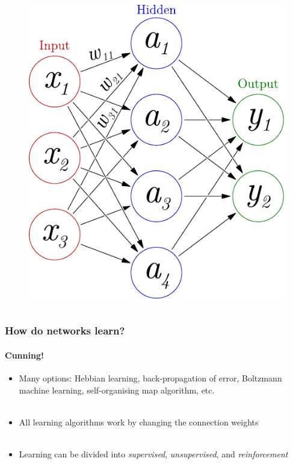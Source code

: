 \documentclass{beamer}
\newcommand{\figheight}{0.72\textheight}
\begin{document}
\begin{frame}
\begin{columns}[T]
\begin{column}{.55\textwidth}
\begin{figure}[t]
\begin{flushleft}
	\includegraphics[height = \figheight]{./fig/3-layer_maths.pdf}
	\vspace{1cm}
	\end{flushleft}
	\end{figure}
    \end{column}
  \end{columns}
\end{frame}

\begin{frame}
\frametitle{How do networks learn?}
\framesubtitle{Cunning!}
\begin{itemize}
\item<1-> Many options: Hebbian learning, back-propagation of error, Boltzmann machine learning, self-organising map algorithm, etc. \\ \

\item<2-> All learning algorithms work by changing the connection weights \\ \

\item<3-> Learning can be divided into \emph{supervised}, \emph{unsupervised}, and \emph{reinforcement} \\ \ \end{itemize}
\end{frame}
\end{document}
